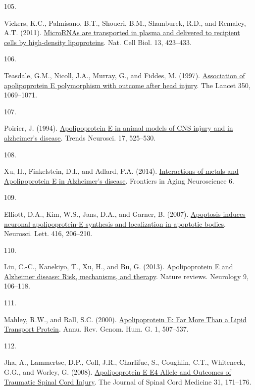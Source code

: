 \documentclass[
]{article}
\newlength{\cslhangindent}
\newlength{\csllabelwidth}
\newlength{\cslentryspacingunit} %
\newenvironment{CSLReferences}[2] %
 {%
  \setlength{\parindent}{0pt}
  \ifodd #1
  \let\oldpar\par
  \def\par{\hangindent=\cslhangindent\oldpar}
  \fi
  \setlength{\parskip}{#2\cslentryspacingunit}
 }%
 {}
\newcommand{\CSLLeftMargin}[1]{\parbox[t]{\csllabelwidth}{#1}}
\newcommand{\CSLRightInline}[1]{\parbox[t]{\linewidth - \csllabelwidth}{#1}\break}
\begin{document}
\begin{CSLReferences}{0}{0}
\leavevmode{}%
\CSLLeftMargin{105. }
\CSLRightInline{Vickers, K.C., Palmisano, B.T., Shoucri, B.M., Shamburek, R.D., and Remaley, A.T. (2011). \href{https://doi.org/10.1038/ncb2210}{{MicroRNAs} are transported in plasma and delivered to recipient cells by high-density lipoproteins}. Nat. Cell Biol. 13, 423--433.}

\leavevmode{}%
\CSLLeftMargin{106. }
\CSLRightInline{Teasdale, G.M., Nicoll, J.A., Murray, G., and Fiddes, M. (1997). \href{https://doi.org/10.1016/S0140-6736(97)04318-3}{Association of apolipoprotein {E} polymorphism with outcome after head injury}. The Lancet 350, 1069--1071.}

\leavevmode{}%
\CSLLeftMargin{107. }
\CSLRightInline{Poirier, J. (1994). \href{https://doi.org/10.1016/0166-2236(94)90156-2}{Apolipoprotein {E} in animal models of {CNS} injury and in alzheimer's disease}. Trends Neurosci. 17, 525--530.}

\leavevmode{}%
\CSLLeftMargin{108. }
\CSLRightInline{Xu, H., Finkelstein, D.I., and Adlard, P.A. (2014). \href{https://doi.org/10.3389/fnagi.2014.00121}{Interactions of metals and {Apolipoprotein E} in {Alzheimer}'s disease}. Frontiers in Aging Neuroscience 6.}

\leavevmode{}%
\CSLLeftMargin{109. }
\CSLRightInline{Elliott, D.A., Kim, W.S., Jans, D.A., and Garner, B. (2007). \href{https://doi.org/10.1016/j.neulet.2007.02.014}{Apoptosis induces neuronal apolipoprotein-{E} synthesis and localization in apoptotic bodies}. Neurosci. Lett. 416, 206--210.}

\leavevmode{}%
\CSLLeftMargin{110. }
\CSLRightInline{Liu, C.-C., Kanekiyo, T., Xu, H., and Bu, G. (2013). \href{https://doi.org/10.1038/nrneurol.2012.263}{Apolipoprotein {E} and {Alzheimer} disease: Risk, mechanisms, and therapy}. Nature reviews. Neurology 9, 106--118.}

\leavevmode{}%
\CSLLeftMargin{111. }
\CSLRightInline{Mahley, R.W., and Rall, S.C. (2000). \href{https://doi.org/10.1146/annurev.genom.1.1.507}{Apolipoprotein {E}: {Far More Than} a {Lipid Transport Protein}}. Annu. Rev. Genom. Hum. G. 1, 507--537.}

\leavevmode{}%
\CSLLeftMargin{112. }
\CSLRightInline{Jha, A., Lammertse, D.P., Coll, J.R., Charlifue, S., Coughlin, C.T., Whiteneck, G.G., and Worley, G. (2008). \href{https://www.ncbi.nlm.nih.gov/pmc/articles/PMC2565476}{Apolipoprotein {E E4 Allele} and {Outcomes} of {Traumatic Spinal Cord Injury}}. The Journal of Spinal Cord Medicine 31, 171--176.}


\end{CSLReferences}
\end{document}
